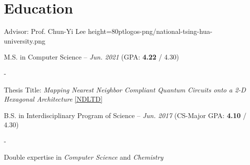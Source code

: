 \documentclass{cvclass}
\begin{document}

\section{Education}

        {Advisor: Prof. Chun-Yi Lee}
        {height=80pt}{logos-png/national-tsing-hua-university.png}{
    \item M.S. in Computer Science -- \textit{Jun. 2021} (GPA: \textbf{4.22} / 4.30)
    \begin{plainitemize}{-}
        \item Thesis Title: \textit{Mapping Nearest Neighbor Compliant Quantum Circuits onto a 2-D Hexagonal Architecture} \href{https://hdl.handle.net/11296/dpttkc}{[NDLTD]}
    \end{plainitemize}
    \item B.S. in Interdisciplinary Program of Science -- \textit{Jun. 2017} (CS-Major GPA: \textbf{4.10} / 4.30)
    \begin{plainitemize}{-}
        \item Double expertise in \textit{Computer Science} and \textit{Chemistry}
    \end{plainitemize}}


\makepublications
\end{document}
